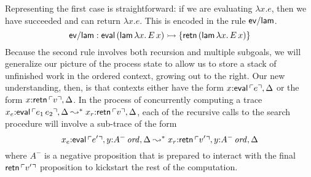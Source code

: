 Representing the first case is straightforward: if we are evaluating
$\lambda x.e$, then we have succeeded and can return $\lambda x.e$. 
This is encoded in the rule ${\sf ev/lam}$. 
\[
{\sf ev/lam} : {\sf eval}\,({\sf lam}\,\lambda x.\,E\,x)
   \rightarrowtail \{ {\sf retn}\,({\sf lam}\,\lambda x.\,E\,x) \}
\]
Because the second rule involves both recursion and multiple subgoals,
we will generalize our picture of the process state to allow us to store a
stack of unfinished work in the ordered context, growing out to the
right. Our new understanding, then, is that contexts either have the
form $x{:}{\sf eval}\,{\ulcorner{e}\urcorner}, \Delta$ or the form $x{:}{\sf
  retn}\,{\ulcorner{v}\urcorner}, \Delta$. In the process of concurrently
computing a trace $x_e{:}{\sf eval}\,{\ulcorner{e_1\,e_2}\urcorner}, \Delta
\leadsto^* x_r{:}{\sf retn}\,{\ulcorner{v}\urcorner}, \Delta$, each of the
recursive calls to the search procedure will involve a sub-trace of the
form
%
\[x_e{:}{\sf eval}\,{\ulcorner{e'}\urcorner}, y{:}{A^-}\,{{\it ord}}, \Delta
  \leadsto^*
  x_r{:}{\sf retn}\,{\ulcorner{v'}\urcorner}, y{:}{A^-}\,{{\it ord}}, \Delta\]
%
where $A^-$ is a negative proposition that is prepared to interact
with the final ${\sf retn}\,{\ulcorner{v'}\urcorner}$ proposition to kickstart the
rest of the computation.


